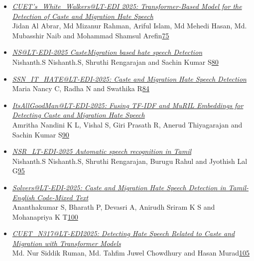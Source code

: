 \documentclass[11pt,oneside]{book}
\begin{document}
\begin{itemize}[leftmargin=*,label={}]
       \item \hyperlink{page.75}{\emph{CUET's\_White\_Walkers@LT-EDI 2025: Transformer-Based Model for the Detection of Caste and Migration Hate Speech}}\\ \hspace*{2em} Jidan Al Abrar, Md Mizanur Rahman, Ariful Islam, Md Mehedi Hasan, Md. Mubasshir Naib and Mohammad Shamsul Arefin\dotfill \hyperlink{page.75}{75}
       \item \hyperlink{page.80}{\emph{NS@LT-EDI-2025 CasteMigration based hate speech Detection}}\\ \hspace*{2em} Nishanth.S Nishanth.S, Shruthi Rengarajan and Sachin Kumar S\dotfill \hyperlink{page.80}{80}
       \item \hyperlink{page.84}{\emph{SSN\_IT\_HATE@LT-EDI-2025: Caste and Migration Hate Speech Detection}}\\ \hspace*{2em} Maria Nancy C, Radha N and Swathika R\dotfill \hyperlink{page.84}{84}
       \item \hyperlink{page.90}{\emph{ItsAllGoodMan@LT-EDI-2025: Fusing TF-IDF and MuRIL Embeddings for Detecting Caste and Migration Hate Speech}}\\ \hspace*{2em} Amritha Nandini K L, Vishal S, Giri Prasath R, Anerud Thiyagarajan and Sachin Kumar S\dotfill \hyperlink{page.90}{90}
       \item \hyperlink{page.95}{\emph{NSR\_LT-EDI-2025 Automatic speech recognition in Tamil}}\\ \hspace*{2em} Nishanth.S Nishanth.S, Shruthi Rengarajan, Burugu Rahul and Jyothish Lal G\dotfill \hyperlink{page.95}{95}
       \item \hyperlink{page.100}{\emph{Solvers@LT-EDI-2025: Caste and Migration Hate Speech Detection in Tamil-English Code-Mixed Text}}\\ \hspace*{2em} Ananthakumar S, Bharath P, Devasri A, Anirudh Sriram K S and Mohanapriya K T\dotfill \hyperlink{page.100}{100}
       \item \hyperlink{page.105}{\emph{CUET\_N317@LT-EDI2025: Detecting Hate Speech Related to Caste and Migration with Transformer Models}}\\ \hspace*{2em} Md. Nur Siddik Ruman, Md. Tahfim Juwel Chowdhury and Hasan Murad\dotfill \hyperlink{page.105}{105}

\end{itemize}
\end{document}
